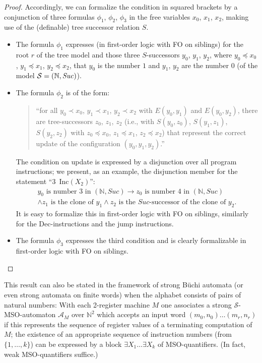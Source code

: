 \documentclass[copyright,creativecommons]{eptcs}
\theoremstyle{plain}
\theoremstyle{nonumberplain}
\newtheorem{proof}{Proof}
\newcommand{\Suc}{\ensuremath{\mathit{Suc}}}
\begin{document}
\begin{proof}
Accordingly, we can formalize the condition in squared brackets by a conjunction of three formulas $\phi_1$, $\phi_2$, $\phi_3$ in the free variables $x_0$, $x_1$, $x_2$, making use of the (definable) tree successor relation $S$. 
\begin{itemize}
  \item The formula $\phi_1$ expresses (in first-order logic with FO on siblings) for the root $r$ of the tree model and those three $S$-successors $y_0$, $y_1$, $y_2$, where $y_0 \preceq x_0$, $y_1 \preceq x_1$, $y_2 \preceq x_2$, that $y_0$ is the number $1$ and $y_1$, $y_2$ are the number $0$ (of the model ${\cal S}=(\mathbb{N},\Suc)$).
  \item The formula $\phi_2$ is of the form: 
  \begin{quotation}\noindent
    ``for all $y_0 \prec x_0$, $y_1 \prec x_1$, $y_2 \prec x_2$ with $E(y_0,y_1)$ and $E(y_0,y_2)$, there are tree-successors $z_0$, $z_1$, $z_2$ (i.e., with $S(y_0,z_0)$, $S(y_1,z_1)$, $S(y_2,z_2)$ with $z_0 \preceq x_0$, $z_1 \preceq x_1$, $z_2 \preceq x_2$) that represent the correct update of the configuration $(y_0,y_1,y_2)$.''
  \end{quotation}
  The condition on update is expressed by a disjunction over all program instructions; we present, as an example, the disjunction member for the statement ``$3$~Inc$(X_2)$'':
  \begin{multline*}
    y_0 \text{ is number $3$ in } (\mathbb{N},\Suc) \to z_0 \text{ is number $4$ in } (\mathbb{N},\Suc)\\
    \wedge z_1 \text{ is the clone of }y_1 \wedge z_2 \text{ is the $\Suc$-successor of the clone of }y_2.
  \end{multline*}
  It is easy to formalize this in first-order logic with FO on siblings, similarly for the Dec-instructions and the jump instructions.
  \item The formula $\phi_3$ expresses the third condition and is clearly formalizable in first-order logic with FO on siblings.
\end{itemize}
\end{proof}

This result can also be stated in the framework of strong 
B\"uchi automata (or even strong automata on finite words) when 
the alphabet consists of pairs of natural numbers: 
With each 2-register machine $M$ one associates 
a strong $\mathcal{S}$-MSO-automaton $\mathcal{A}_M$ over $\mathbb{N}^2$
which accepts an input word $(m_0,n_0) \ldots (m_r,n_r)$ if this represents 
the sequence of register values of a terminating computation of $M$; the 
existence of an appropriate sequence of instruction numbers (from $\{1, \ldots, k\}$)
can be expressed by a block $\exists X_1 \ldots \exists X_k$ of MSO-quantifiers. 
(In fact, weak MSO-quantifiers suffice.)    
   
\end{document}
